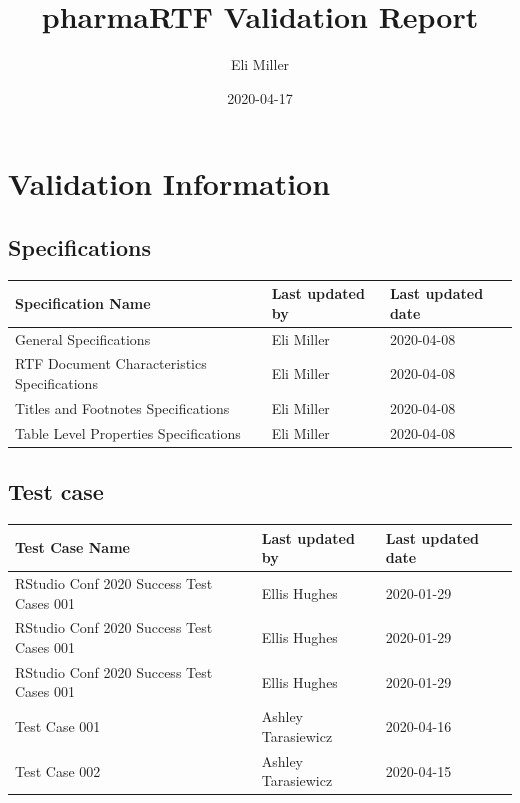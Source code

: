 \documentclass[]{article}
\title{pharmaRTF Validation Report}
\author{Eli Miller}
\date{2020-04-17}
\begin{document}
\maketitle

\newpage
\tableofcontents
\newpage

\hypertarget{validation-information}{%
\section{Validation Information}\label{validation-information}}

\hypertarget{specifications}{%
\subsection{Specifications}\label{specifications}}

\begin{table}[H]
\centering
\begin{tabular}{l|l|l}
\hline
Specification Name & Last updated by & Last updated date\\
\hline
General Specifications & Eli Miller & 2020-04-08\\
\hline
RTF Document Characteristics Specifications & Eli Miller & 2020-04-08\\
\hline
Titles and Footnotes Specifications & Eli Miller & 2020-04-08\\
\hline
Table Level Properties Specifications & Eli Miller & 2020-04-08\\
\hline
\end{tabular}
\end{table}

\hypertarget{test-case}{%
\subsection{Test case}\label{test-case}}

\begin{table}[H]
\centering
\begin{tabular}{l|l|l}
\hline
Test Case Name & Last updated by & Last updated date\\
\hline
RStudio Conf 2020 Success Test Cases 001 & Ellis Hughes & 2020-01-29\\
\hline
RStudio Conf 2020 Success Test Cases 001 & Ellis Hughes & 2020-01-29\\
\hline
RStudio Conf 2020 Success Test Cases 001 & Ellis Hughes & 2020-01-29\\
\hline
Test Case 001 & Ashley Tarasiewicz & 2020-04-16\\
\hline
Test Case 002 & Ashley Tarasiewicz & 2020-04-15\\
\hline
\end{tabular}
\end{table}
\end{document}
